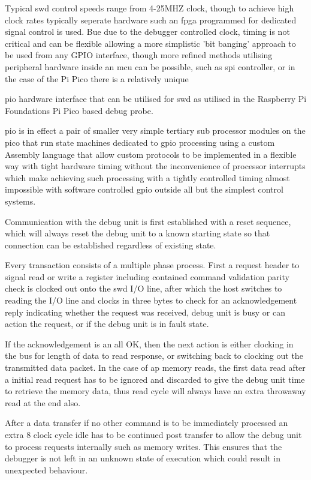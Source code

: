 Typical \gls{swd} control speeds range from 4-25MHZ clock, though to achieve high clock rates typically seperate hardware such an \gls{fpga} programmed for dedicated signal control is used. Bue due to the debugger controlled clock, timing is not critical and can be flexible allowing a more simplistic 'bit banging' approach to be used from any GPIO interface, though more refined methods utilising peripheral hardware inside an \gls{mcu} can be possible, such as \gls{spi} controller, or in the case of the Pi Pico there is a relatively unique {\gls{pio} hardware interface that can be utilised for \gls{swd} as utilised in the Raspberry Pi Foundations Pi Pico based debug probe.

\gls{pio} is in effect a pair of smaller very simple tertiary sub processor modules on the pico that run state machines dedicated to \gls{gpio} processing using a custom Assembly language that allow custom protocols to be implemented in a flexible way with tight hardware timing without the inconvenience of processor interrupts which make achieving such processing with a tightly controlled timing almost impossible with software controlled \gls{gpio} outside all but the simplest control systems.


Communication with the debug unit is first established with a reset sequence, which will always reset the debug unit to a known starting state so that connection can be established regardless of existing state.

Every transaction consists of a multiple phase process. First a request header to signal read or write a register including contained command validation parity check is clocked out onto the \gls{swd} I/O line, after which the host switches to reading the I/O line and clocks in three bytes to check for an acknowledgement reply indicating whether the request was received, debug unit is busy or can action the request, or if the debug unit is in fault state.

If the acknowledgement is an all OK, then the next action is either clocking in the bus for length of data to read response, or switching back to clocking out the transmitted data packet. In the case of \gls{ap} memory reads, the first data read after a initial read request has to be ignored and discarded to give the debug unit time to retrieve the memory data, thus read cycle will always have an extra throwaway read at the end also.

After a data transfer if no other command is to be immediately processed an extra 8 clock cycle idle has to be continued post transfer to allow the debug unit to process requests internally such as memory writes. This ensures that the debugger is not left in an unknown state of execution which could result in unexpected behaviour.

}
